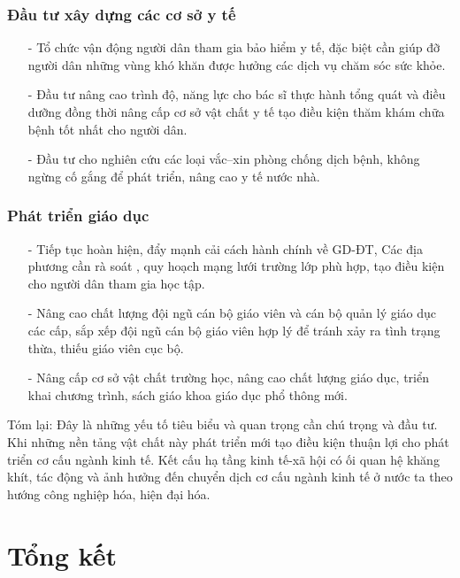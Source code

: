\subsection{Đầu tư xây dựng các cơ sở y tế}
\begin{itemize}
\item[-] Tổ chức vận động người dân tham gia bảo hiểm y tế, đặc biệt cần giúp đỡ người dân những vùng khó khăn được hưởng các dịch vụ chăm sóc sức khỏe.

\item[-] Đầu tư nâng cao trình độ, năng lực cho bác sĩ thực hành tổng quát và điều dưỡng đồng thời nâng cấp cơ sở vật chất y tế tạo điều kiện thăm khám chữa bệnh tốt nhất cho người dân.

\item[-] Đầu tư cho nghiên cứu các loại vắc–xin phòng chống dịch bệnh, không ngừng cố gắng để phát triển, nâng cao y tế nước nhà.
\end{itemize}


\subsection{Phát triển giáo dục}
\begin{itemize}
\item[-] Tiếp tục hoàn hiện, đẩy mạnh cải cách hành chính về GD-ĐT, Các địa phương cần rà soát , quy hoạch mạng lưới trường lớp phù hợp, tạo điều kiện cho người dân tham gia học tập.

\item[-] Nâng cao chất lượng đội ngũ cán bộ giáo viên và cán bộ quản lý giáo dục các cấp, sắp xếp đội ngũ cán bộ giáo viên hợp lý để tránh xảy ra tình trạng thừa, thiếu giáo viên cục bộ.

\item[-] Nâng cấp cơ sở vật chất trường học, nâng cao chất lượng giáo dục, triển khai chương trình, sách giáo khoa giáo dục phổ thông mới.


\end{itemize}
Tóm lại: Đây là những yếu tố tiêu biểu và quan trọng cần chú trọng và đầu tư. Khi những nền tảng vật chất này phát triển mới tạo điều kiện thuận lợi cho phát triển cơ cấu ngành kinh tế. Kết cấu hạ tầng kinh tế-xã hội có ối quan hệ khăng khít, tác động và ảnh hưởng đến chuyển dịch cơ cấu ngành kinh tế ở nước ta theo hướng công nghiệp hóa, hiện đại hóa.



\chapter{Tổng kết}

